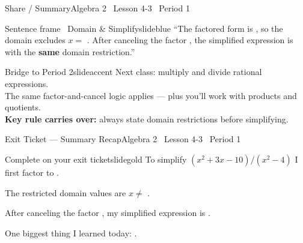 \documentclass[aspectratio=169, 11pt]{beamer}
\begin{document}
\begin{frame}{Share / Summary}{Algebra 2 \textperiodcentered\ Lesson 4-3 \textperiodcentered\ Period 1}
\vspace{0.2cm}
\begin{projcard}{Sentence frame \textperiodcentered\ Domain \& Simplify}{slideblue}
``The factored form is \underline{\hspace{1.8cm}}, so the domain excludes \(x =\) \underline{\hspace{1cm}}.
After canceling the factor \underline{\hspace{1.5cm}}, the simplified expression is \underline{\hspace{1.5cm}}
with the \textbf{same} domain restriction.''
\end{projcard}

\vspace{0.15cm}
\begin{projcard}{Bridge to Period 2}{slideaccent}
Next class: multiply and divide rational expressions.\\
The same factor-and-cancel logic applies --- plus you'll work with products and quotients.\\
\textbf{Key rule carries over:} always state domain restrictions before simplifying.
\end{projcard}
\end{frame}

\begin{frame}{Exit Ticket --- Summary Recap}{Algebra 2 \textperiodcentered\ Lesson 4-3 \textperiodcentered\ Period 1}
\vspace{0.2cm}
\begin{projcard}{Complete on your exit ticket}{slidegold}
To simplify \((x^2+3x-10)/(x^2-4)\) I first factor to \underline{\hspace{3.5cm}}.

\vspace{0.3cm}
The restricted domain values are \(x \ne\) \underline{\hspace{2cm}}.

\vspace{0.3cm}
After canceling the factor \underline{\hspace{2cm}}, my simplified expression is \underline{\hspace{2cm}}.

\vspace{0.3cm}
One biggest thing I learned today: \underline{\hspace{5cm}}.
\end{projcard}
\end{frame}
\end{document}
